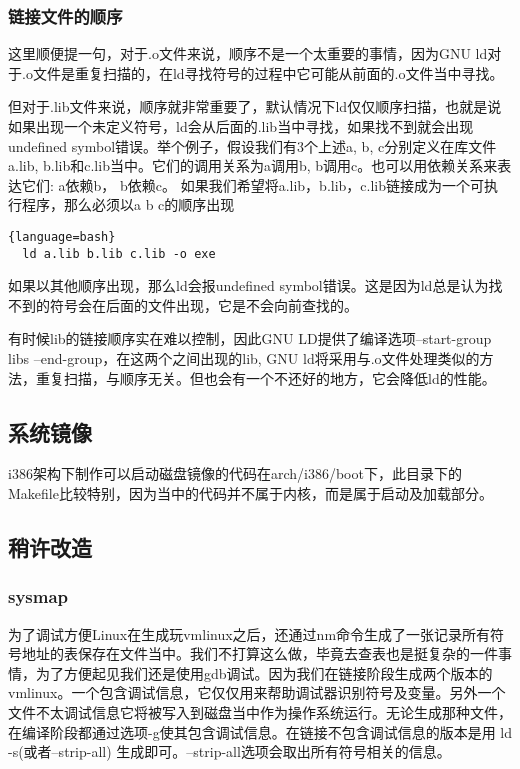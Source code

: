 \subsubsection{链接文件的顺序}
这里顺便提一句，对于.o文件来说，顺序不是一个太重要的事情，因为GNU ld对于.o文件是重复扫描的，在ld寻找符号的过程中它可能从前面的.o文件当中寻找。

但对于.lib文件来说，顺序就非常重要了，默认情况下ld仅仅顺序扫描，也就是说如果出现一个未定义符号，ld会从后面的.lib当中寻找，如果找不到就会出现undefined symbol错误。举个例子，假设我们有3个上述a, b, c分别定义在库文件a.lib, b.lib和c.lib当中。它们的调用关系为a调用b, b调用c。也可以用依赖关系来表达它们: a依赖b， b依赖c。
如果我们希望将a.lib，b.lib，c.lib链接成为一个可执行程序，那么必须以a b c的顺序出现
\begin{lstlisting}{language=bash}
  ld a.lib b.lib c.lib -o exe
\end{lstlisting}
如果以其他顺序出现，那么ld会报undefined symbol错误。这是因为ld总是认为找不到的符号会在后面的文件出现，它是不会向前查找的。

有时候lib的链接顺序实在难以控制，因此GNU LD提供了编译选项--start-group libs --end-group，在这两个之间出现的lib, GNU ld将采用与.o文件处理类似的方法，重复扫描，与顺序无关。但也会有一个不还好的地方，它会降低ld的性能。

\subsection{系统镜像}
i386架构下制作可以启动磁盘镜像的代码在arch/i386/boot下，此目录下的Makefile比较特别，因为当中的代码并不属于内核，而是属于启动及加载部分。

\subsection{稍许改造}
\subsubsection{sysmap}
为了调试方便Linux在生成玩vmlinux之后，还通过nm命令生成了一张记录所有符号地址的表保存在文件当中。我们不打算这么做，毕竟去查表也是挺复杂的一件事情，为了方便起见我们还是使用gdb调试。因为我们在链接阶段生成两个版本的vmlinux。一个包含调试信息，它仅仅用来帮助调试器识别符号及变量。另外一个文件不太调试信息它将被写入到磁盘当中作为操作系统运行。无论生成那种文件，在编译阶段都通过选项-g使其包含调试信息。在链接不包含调试信息的版本是用 ld -s(或者--strip-all) 生成即可。--strip-all选项会取出所有符号相关的信息。
